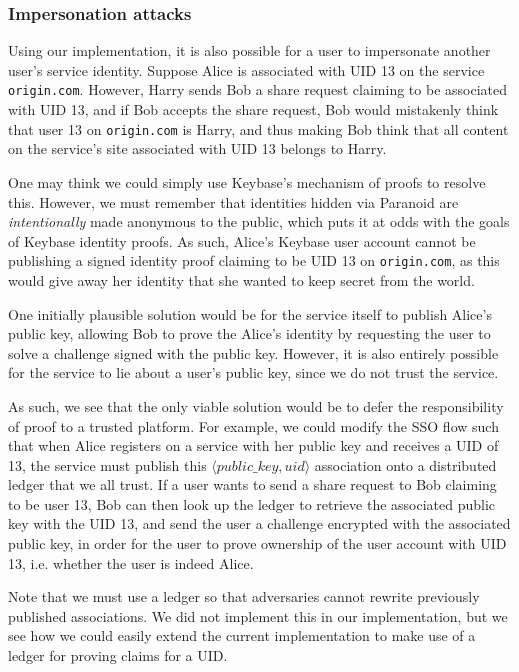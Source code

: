 \documentclass[letterpaper,twocolumn,10pt]{article}
\begin{document}
\subsubsection{Impersonation attacks}

Using our implementation, it is also possible for a user to impersonate another user's service identity. Suppose Alice is associated with UID 13 on the service \texttt{origin.com}. However, Harry sends Bob a share request claiming to be associated with UID 13, and if Bob accepts the share request, Bob would mistakenly think that user 13 on \texttt{origin.com} is Harry, and thus making Bob think that all content on the service's site associated with UID 13 belongs to Harry.

One may think we could simply use Keybase's mechanism of proofs to resolve this. However, we must remember that identities hidden via Paranoid are \textit{intentionally} made anonymous to the public, which puts it at odds with the goals of Keybase identity proofs. As such, Alice's Keybase user account cannot be publishing a signed identity proof claiming to be UID 13 on \texttt{origin.com}, as this would give away her identity that she wanted to keep secret from the world.

One initially plausible solution would be for the service itself to publish Alice's public key, allowing Bob to prove the Alice's identity by requesting the user to solve a challenge signed with the public key. However, it is also entirely possible for the service to lie about a user's public key, since we do not trust the service.

As such, we see that the only viable solution would be to defer the responsibility of proof to a trusted platform. For example, we could modify the SSO flow such that when Alice registers on a service with her public key and receives a UID of 13, the service must publish this $\langle public\_key, uid \rangle$ association onto a distributed ledger that we all trust. If a user wants to send a share request to Bob claiming to be user 13, Bob can then look up the ledger to retrieve the associated public key with the UID 13, and send the user a challenge encrypted with the associated public key, in order for the user to prove ownership of the user account with UID 13, i.e. whether the user is indeed Alice.

Note that we must use a ledger so that adversaries cannot rewrite previously published associations. We did not implement this in our implementation, but we see how we could easily extend the current implementation to make use of a ledger for proving claims for a UID.
\end{document}
